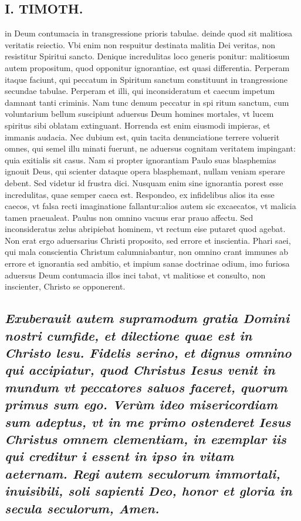 \documentclass{article}
\begin{document}
\begin{pages}
\section*{I. TIMOTH. }
\marginpar{[ p.10 ]}\pstart in Deum contumacia in transgressione prioris tabulae. deinde quod sit malitiosa veritatis reiectio. Vbi enim non respuitur destinata malitia Dei veritas, non resistitur Spiritui sancto. Denique incredulitas loco generis ponitur: malitiosum autem propositum, quod opponitur ignorantiae, est quasi differentia. Perperam itaque faciunt, qui peccatum in Spiritum sanctum constituunt in trangressione secundae tabulae. Perperam et illi, qui inconsideratum et caecum impetum damnant tanti criminis. Nam tunc demum peccatur in spi ritum sanctum, cum voluntarium bellum suscipiunt aduersus Deum homines mortales, vt lucem spiritus sibi oblatam extinguant. Horrenda est enim eiusmodi impieras, et immanis audacia. Nec dubium est, quin tacita denunciatione terrere voluerit omnes, qui semel illu minati fuerunt, ne aduersus cognitam veritatem impingant: quia exitialis sit casus. Nam si propter ignorantiam Paulo suas blasphemias ignouit Deus, qui scienter dataque opera blasphemant, nullam veniam sperare debent. Sed videtur id frustra dici. Nusquam enim sine ignorantia porest esse incredulitas, quae semper caeca est. Respondeo, ex infidelibus alios ita esse caecos, vt falsa recti imaginatione fallantur:alios autem sic excaecatos, vt malicia tamen praeualeat. Paulus non omnino vacuus erar prauo affectu. Sed inconsideratus zelus abripiebat hominem, vt rectum eise putaret quod agebat. Non erat ergo aduersarius Christi proposito, sed errore et inscientia. Phari saei, qui mala conscientia Christum calumniabantur, non omnino crant immunes ab errore et ignorantia sed ambitio, et impium sanae doctrinae odium, imo furiosa aduersus Deum contumacia illos inci tabat, vt malitiose et consulto, non inscienter, Christo se opponerent.  \pend
{}
{}
\subsection*{\textit{Exuberauit autem supramodum gratia Domini nostri cumfide, et dilectione quae est in Christo lesu. Fidelis serino, et dignus omnino qui accipiatur, quod Christus Iesus venit in mundum vt peccatores saluos faceret, quorum primus sum ego. Verùm ideo misericordiam sum adeptus, vt in me primo ostenderet Iesus Christus omnem clementiam, in exemplar iis qui creditur i essent in ipso in vitam aeternam. Regi autem seculorum immortali, inuisibili, soli sapienti Deo, honor et gloria in secula seculorum, Amen. }}

\end{pages}
\end{document}
